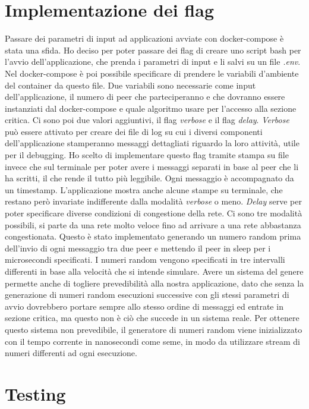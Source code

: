 \documentclass[conference]{IEEEtran}
\begin{document}
\section{Implementazione dei flag}

Passare dei parametri di input ad applicazioni avviate con docker-compose è stata una sfida. Ho deciso per poter passare dei flag di creare uno script bash per l'avvio dell'applicazione, che prenda i parametri di input e li salvi su un file \textit{.env}. Nel docker-compose è poi possibile specificare di prendere le variabili d'ambiente del container da questo file. Due variabili sono necessarie come input dell'applicazione, il numero di peer che parteciperanno e che dovranno essere instanziati dal docker-compose e quale algoritmo usare per l'accesso alla sezione critica. Ci sono poi due valori aggiuntivi, il flag \textit{verbose} e il flag \textit{delay}. \textit{Verbose} può essere attivato per creare dei file di log su cui i diversi componenti dell'applicazione stamperanno messaggi dettagliati riguardo la loro attività, utile per il debugging. Ho scelto di implementare questo flag tramite stampa su file invece che sul terminale per poter avere i messaggi separati in base al peer che li ha scritti, il che rende il tutto più leggibile. Ogni messaggio è accompagnato da un timestamp. L'applicazione mostra anche alcune stampe su terminale, che restano però invariate indifferente dalla modalità \textit{verbose} o meno. \textit{Delay} serve per poter specificare diverse condizioni di congestione della rete. Ci sono tre modalità possibili, si parte da una rete molto veloce fino ad arrivare a una rete abbastanza congestionata. Questo è stato implementato generando un numero random prima dell'invio di ogni messaggio tra due peer e mettendo il peer in sleep per i microsecondi specificati. I numeri random vengono specificati in tre intervalli differenti in base alla velocità che si intende simulare. Avere un sistema del genere permette anche di togliere prevedibilità alla nostra applicazione, dato che senza la generazione di numeri random esecuzioni successive con gli stessi parametri di avvio dovrebbero portare sempre allo stesso ordine di messaggi ed entrate in sezione critica, ma questo non è ciò che succede in un sistema reale. Per ottenere questo sistema non prevedibile, il generatore di numeri random viene inizializzato con il tempo corrente in nanosecondi come seme, in modo da utilizzare stream di numeri differenti ad ogni esecuzione.

\section{Testing}
\end{document}

